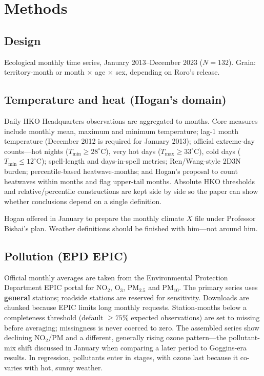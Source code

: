 \documentclass[11pt,a4paper]{article}
\begin{document}
\section{Methods}

\subsection{Design}
Ecological monthly time series, January 2013--December 2023 ($N=132$). Grain: territory-month or month $\times$ age $\times$ sex, depending on Roro's release.

\subsection{Temperature and heat (Hogan's domain)}
Daily HKO Headquarters observations are aggregated to months. Core measures include monthly mean, maximum and minimum temperature; lag-1 month temperature (December 2012 is required for January 2013); official extreme-day counts---hot nights ($T_{\min}\ge 28^\circ$C), very hot days ($T_{\max}\ge 33^\circ$C), cold days ($T_{\min}\le 12^\circ$C); spell-length and days-in-spell metrics; Ren/Wang-style 2D3N burden; percentile-based heatwave-months; and Hogan's proposal to count heatwaves within months and flag upper-tail months. Absolute HKO thresholds and relative/percentile constructions are kept side by side so the paper can show whether conclusions depend on a single definition.

Hogan offered in January to prepare the monthly climate $X$ file under Professor Bishai's plan. Weather definitions should be finished with him---not around him.

\subsection{Pollution (EPD EPIC)}
Official monthly averages are taken from the Environmental Protection Department EPIC portal for NO$_2$, O$_3$, PM$_{2.5}$ and PM$_{10}$. The primary series uses \textbf{general} stations; roadside stations are reserved for sensitivity. Downloads are chunked because EPIC limits long monthly requests. Station-months below a completeness threshold (default $\ge 75\%$ expected observations) are set to missing before averaging; missingness is never coerced to zero. The assembled series show declining NO$_2$/PM and a different, generally rising ozone pattern---the pollutant-mix shift discussed in January when comparing a later period to Goggins-era results. In regression, pollutants enter in stages, with ozone last because it co-varies with hot, sunny weather.
\end{document}

